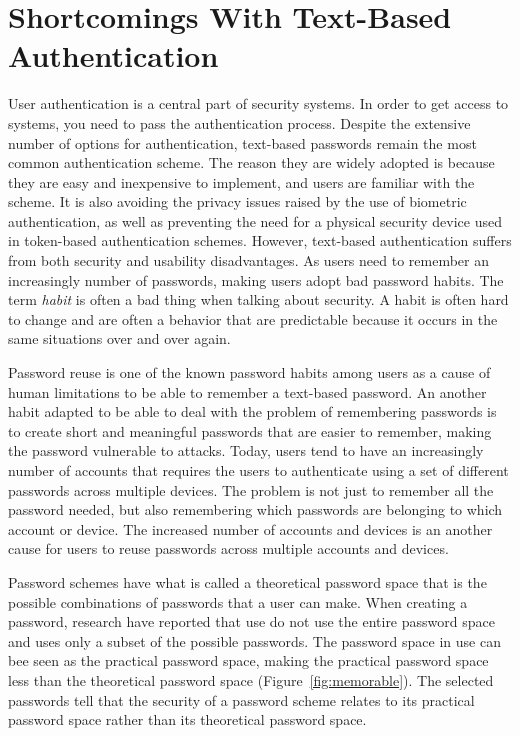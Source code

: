 \section{Shortcomings With Text-Based Authentication} \label{sec:shortcomings}

  User authentication is a central part of security systems. In order to get access to systems, you need to pass the authentication process. Despite the extensive number of options for authentication, text-based passwords remain the most common authentication scheme. The reason they are widely adopted is because they are easy and inexpensive to implement, and users are familiar with the scheme. It is also avoiding the privacy issues raised by the use of biometric authentication, as well as preventing the need for a physical security device used in token-based authentication schemes. However, text-based authentication suffers from both security and usability disadvantages. As users need to remember an increasingly number of passwords, making users adopt bad password habits. The term {\it habit} is often a bad thing when talking about security. A habit is often hard to change and are often a behavior that are predictable because it occurs in the same situations over and over again. 

  Password reuse is one of the known password habits among users as a cause of human limitations to be able to remember a text-based password. An another habit adapted to be able to deal with the problem of remembering passwords is to create short and meaningful passwords that are easier to remember, making the password vulnerable to attacks. Today, users tend to have an increasingly number of accounts that requires the users to authenticate using a set of different passwords across multiple devices. The problem is not just to remember all the password needed, but also remembering which passwords are belonging to which account or device. The increased number of accounts and devices is an another cause for users to reuse passwords across multiple accounts and devices.

  Password schemes have what is called a theoretical password space that is the possible combinations of passwords that a user can make. When creating a password, research have reported that use do not use the entire password space and uses only a subset of the possible passwords. The password space in use can bee seen as the practical password space, making the practical password space less than the theoretical password space (Figure~\ref{fig:memorable}).  The selected passwords tell that the security of a password scheme relates to its practical password space rather than its theoretical password space.

